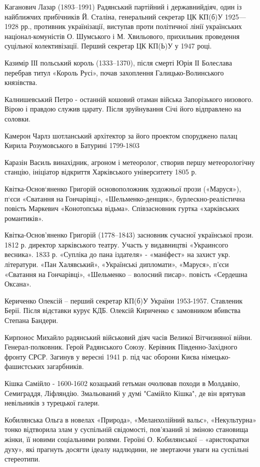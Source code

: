Каганович Лазар (1893–1991) Радянський партійний і державнийдіяч, один із найближчих прибічників Й. Сталіна, генеральний секретар ЦК КП(б)У 1925—1928 рр., противник українізації, виступав проти політичної лінії українських націонал-комуністів О. Шумського і М. Хвильового, прихильник проведення суцільної колективізації. Перший секретар ЦК КП(Ь)У у 1947 році.

Казимір ІІІ польський король (1333–1370), після смерті Юрія ІІ Болеслава перебрав титул «Король Русі», почав захоплення Галицько-Волинського князівства.

Калнишевський  Петро - останній кошовий отаман війська Запорізького низового. Вірою і правдою служив царату. Після зруйнування Січі його відправлено на соловки.

Камерон Чарлз шотланський архітектор за його проектом споруджено  палац Кирила Розумовського в Батурині 1799-1803 

Каразін Василь винахідник, агроном і метеоролог, створив першу метеорологічну станцію, ініціатор відкриття Харківського університету 1805 р.

Квітка-Основ‘яненко Григорій основоположник художньої прози («Маруся»), п‘єси «Сватання на Гончарівці», «Шельменко-денщик», бурлескно-реалістична повість Маркевич «Конотопська відьма». Співзасновник гуртка «харківських романтиків».

Квітка-Основ’яненко Григорій (1778–1843) засновник сучасної української прози. 1812 р. директор харківського театру. Участь у видавництві «Украинсого весника». 1833 р. «Супліка до пана іздателя» - «маніфест» на захист укр. літератури. «Пан Халявський», «Українські дипломати», «Маруся», п’єси «Сватання на Гончарівці»,  «Шельменко – волосний писар». повість «Сердешна Оксана».

Кериченко Олексій – перший секретар КП(б)У України 1953-1957. Ставленик Берії. Після відставки курує КДБ. Олексій Кириченко є замовником вбивства Степана Бандери.

Кирпонос Михайло радянський військовий діяч часів Великої Вітчизняної війни. Генерал-полковник. Герой Радянського Союзу. Керівник Південно-Західного фронту СРСР. Загинув у вересні 1941 р. під час оборони Києва німецько-фашистських загарбників.

Кішка Самійло - 1600-1602 козацький гетьман очолював походи в Молдавію, Семиграддя, Ліфляндію. Змальований у думі "Самійло Кішка", де він врятував невільників з турецької галери.

Кобилянська Ольга  в новелах «Природа», «Меланхолійний вальс», «Некультурна» тонко відтворила злам у суспільній свідомості, пов’язаний зі зміною становища жінки, її новими соціальними ролями. Героїні О. Кобилянської – «аристократки духу», які прагнуть досягти ідеалу надлюдини, не звертаючи уваги на суспільні стереотипи. 


